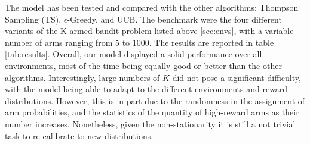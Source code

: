 The model has been tested and compared with the other algorithms: Thompson Sampling (TS), $\epsilon$-Greedy, and UCB. The benchmark were the four different variants of the K-armed bandit problem listed above \ref{sec:envs}, with a variable number of arms ranging from 5 to 1000.
The results are reported in table \ref{tab:results}.
Overall, our model displayed a solid performance over all environments, most of the time being equally good or better than the other algorithms.
Interestingly, large numbers of $K$ did not pose a significant difficulty, with the model being able to adapt to the different environments and reward distributions.
However, this is in part due to the randomness in the assignment of arm probabilities, and the statistics of the quantity of high-reward arms as their number increases. Nonetheless, given the non-stationarity it is still a not trivial task to re-calibrate to new distributions.


